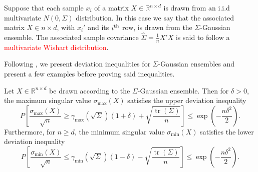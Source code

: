 \documentclass[10pt,handout,english]{beamer}
\DeclareMathOperator{\tr}{tr}
\newcommand{\ts}{\textsuperscript}
\newcommand{\R}{\mathbb{R}}
\begin{document}
\begin{frame}
\begin{definition}
Suppose that each sample $x_i$ of a matrix $X\in\R^{n\times d}$ is drawn from an i.i.d multivariate $N(0,\Sigma)$ distribution. In this case we say that the associated matrix $X\in n\times d$, with $x_i'$ and its $i\ts{th}$ row, is drawn from the $\Sigma$-Gaussian ensemble. The associated sample covariance $\hat{\Sigma}=\frac{1}{n}X'X$ is said to follow a \textcolor{red}{multivariate Wishart distribution}.
\end{definition}
Following \citet{wainwright2019high}, we present deviation inequalities for $\Sigma$-Gaussian ensembles and present a few examples before proving said inequalities.
\end{frame}
\begin{frame}
\begin{theorem}
Let $X\in\R^{n\times d}$ be drawn according to the $\Sigma$-Gaussian ensemble. Then for $\delta>0$, the maximum singular value $\sigma_{\max}(X)$ satisfies the upper deviation inequality
\[
P\left[\frac{\sigma_{\max}(X)}{\sqrt{n}}\geq \gamma_{\max}(\sqrt{\Sigma})(1+\delta)+\sqrt{\frac{\tr(\Sigma)}{n}}\right]\leq\exp\left(-\frac{n\delta^2}{2}\right).
\]
Furthermore, for $n\geq d$, the minimum singular value $\sigma_{\min}(X)$ satisfies the lower deviation inequality
\[
P\left[\frac{\sigma_{\min}(X)}{\sqrt{n}}\leq \gamma_{\min}(\sqrt{\Sigma})(1-\delta)-\sqrt{\frac{\tr(\Sigma)}{n}}\right]\leq\exp\left(-\frac{n\delta^2}{2}\right).
\]
\end{theorem} 
\end{frame}
\end{document}

